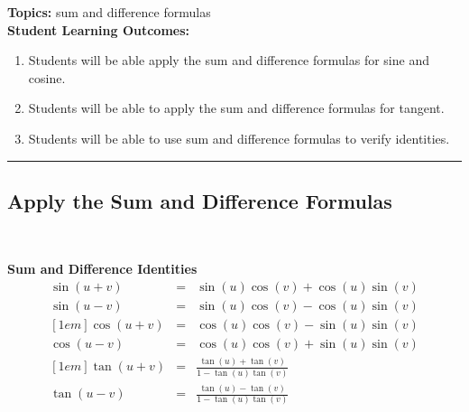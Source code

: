 

\noindent \textbf{Topics:}  sum and difference formulas\\

\noindent \textbf{Student Learning Outcomes:}
\begin{enumerate}
\item Students will be able apply the sum and difference formulas for sine and cosine.
\item Students will be able to apply the sum and difference formulas for tangent.
\item Students will be able to use sum and difference formulas to verify identities.

\end{enumerate}

\hrule 

\bigskip

\subsection{Apply the Sum and Difference Formulas} ~

\begin{boxthm}
{\bf Sum and Difference Identities}
\begin{eqnarray*}
  \sin(u+v) & = & \sin(u) \cos(v) + \cos(u) \sin(v) \\
  \sin(u-v) & = & \sin(u) \cos(v) - \cos(u) \sin(v) \\ [1em]
  \cos(u+v) & = & \cos(u)\cos(v) - \sin(u)\sin(v) \\
  \cos(u-v) & = & \cos(u) \cos(v) + \sin(u) \sin(v) \\ [1em]
  \tan(u+v) & = & \frac{\tan(u) +\tan(v)}{1-\tan(u) \tan(v)} \\
  \tan(u-v) & = & \frac{\tan(u) -\tan(v)}{1-\tan(u) \tan(v)}
\end{eqnarray*}
\end{boxthm}


